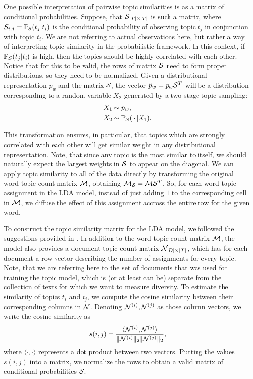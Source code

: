 One possible interpretation of pairwise topic similarities is as a
matrix of conditional probabilities. Suppose, that ${\mathcal S}_{|T|\times|T|}$ is
such a matrix, where $S_{i,j}={\mathbb P}_{\mathcal S}(t_j|t_i)$ is the conditional
probability of observing topic $t_j$ in conjunction with topic $t_i$. We are not
referring to actual observations here, but rather a way of interpreting
topic similarity in the probabilistic framework. In this context, if
${\mathbb P}_{\mathcal S}(t_j|t_i)$ is high, then the topics should be highly correlated with
each other. Notice that for this to be valid, the rows of matrix ${\mathcal S}$
need to form proper distributions, so they need to be normalized.  
Given a distributional representation $p_w$ and the matrix
${\mathcal S}$, the vector $\tilde{p}_w=p_w {\mathcal S}^T$ will be a distribution
corresponding to a random variable $X_2$ generated by a two-stage
topic sampling:
\begin{align*}
X_1&\sim p_w,\\
X_2&\sim {\mathbb P}_{\mathcal S}(\,\cdot\,|X_1).
\end{align*}

This transformation ensures, in particular, that topics which are
strongly correlated with each other will get similar weight in any
distributional representation. Note, that since any topic is the most
similar to itself, we should naturally expect the largest weights in
${\mathcal S}$ to appear on the diagonal. We can apply topic similarity to all
of the data directly by transforming the original word-topic-count
matrix ${\mathcal M}$, obtaining ${\mathcal M}_{\mathcal S}={\mathcal M}{\mathcal S}^T$. So, for each word-topic
assignment in the LDA model, instead of just adding $1$ to the
corresponding cell in ${\mathcal M}$, we diffuse the effect of this assignment
accross the entire row for the given word.

To construct the topic similarity matrix for the LDA model, we
followed the suggestions provided in \cite{bache:2013}. In addition to
the word-topic-count matrix ${\mathcal M}$, the model also provides a
document-topic-count matrix ${\mathcal N}_{|D|\times|T|}$, which has for each
document a row vector describing the number of assignments for
every topic. Note, that we are referring here to the set of documents
that was used for training the topic model, which is (or at least can
be) separate from the collection of texts for which we want to measure
diversity. To estimate the similarity of topics $t_i$ and $t_j$, we
compute the cosine similarity between their corresponding columns in
${\mathcal N}$. Denoting ${\mathcal N}^{(i)},{\mathcal N}^{(j)}$ as those column vectors, we
write the cosine similarity as
\begin{align*}
s(i,j) = \frac{\langle{\mathcal N}^{(i)}, {\mathcal N}^{(j)}\rangle}{\|{\mathcal N}^{(i)}\|_2\|{\mathcal N}^{(j)}\|_2},
\end{align*}
where $\langle\cdot,\cdot\rangle$ represents a dot product between
two vectors. Putting the values $s(i,j)$ into a matrix, we normalize
the rows to obtain a valid matrix of conditional probabilities ${\mathcal S}$.

